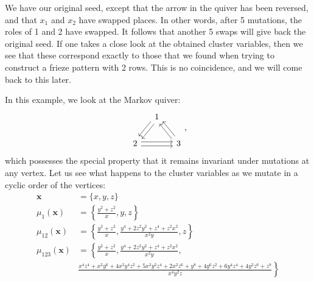 \documentclass{article}
\newcommand{\bx}{\mathbf{x}}
\begin{document}
\begin{example}
	We have our original seed, except that the arrow in the quiver has been reversed, and
	that $x_1$ and $x_2$ have swapped places. In other words, after 5 mutations, the roles
	of 1 and 2 have swapped. It follows that another 5 swaps will give back the original
	seed. If one takes a close look at the obtained cluster variables, then we see that
	these correspond exactly to those that we found when trying to construct a frieze
	pattern with 2 rows. This is no coincidence, and we will come back to this later.
\end{example}
\begin{example}
	In this example, we look at the Markov quiver:
	\begin{equation*}
		\begin{tikzcd}[column sep= small]
			& 1 \ar[ld, shift left] \ar[ld, shift right]\\
			2 \ar[rr, shift left] \ar[rr, shift right] && 3 \ar[lu, shift left] \ar[lu, shift right]
		\end{tikzcd},
	\end{equation*}
	which possesses the special property that it remains invariant under mutations at any
	vertex. Let us see what happens to the cluster variables as we mutate in a cyclic order
	of the vertices:
	\begin{align*}
		\bx            & = \{x, y, z\}                                                                                                                                                                               \\
		\mu_1(\bx)     & = \left\{\frac{y^2 + z^2}{x}, y, z\right\}                                                                                                                                                  \\
		\mu_{12}(\bx)  & = \left\{\frac{y^2 + z^2}{x}, \frac{y^4 + 2 z^2y^2 +z^4 + z^2x^2 }{x^2y}, z\right\}                                                                                                         \\
		\mu_{123}(\bx) & = \left\{\frac{y^2 + z^2}{x}, \frac{y^4 + 2 z^2y^2 +z^4 + z^2x^2 }{x^2y},\right.                                                                                                            \\
		               & \left. \frac{x^{4} z^{4} + x^{2} y^{6} + 4 x^{2} y^{4} z^{2} + 5 x^{2} y^{2} z^{4} + 2 x^{2} z^{6} + y^{8} + 4 y^{6} z^{2} + 6 y^{4} z^{4} + 4 y^{2} z^{6} + z^{8}}{x^{4} y^{2} z} \right\}
	\end{align*}

\end{example}
\end{document}
